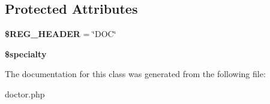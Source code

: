 \subsection*{Protected Attributes}
\begin{DoxyCompactItemize}
\item 
\hypertarget{classDoctor_a33c390b005bd386e1cf6f814ca81f124}{{\bfseries \$\-R\-E\-G\-\_\-\-H\-E\-A\-D\-E\-R} = \char`\"{}D\-O\-C\char`\"{}}\label{classDoctor_a33c390b005bd386e1cf6f814ca81f124}

\item 
\hypertarget{classDoctor_af97e200e45d93d1d193a9804b4c04465}{{\bfseries \$specialty}}\label{classDoctor_af97e200e45d93d1d193a9804b4c04465}

\end{DoxyCompactItemize}


The documentation for this class was generated from the following file\-:\begin{DoxyCompactItemize}
\item 
doctor.\-php\end{DoxyCompactItemize}
